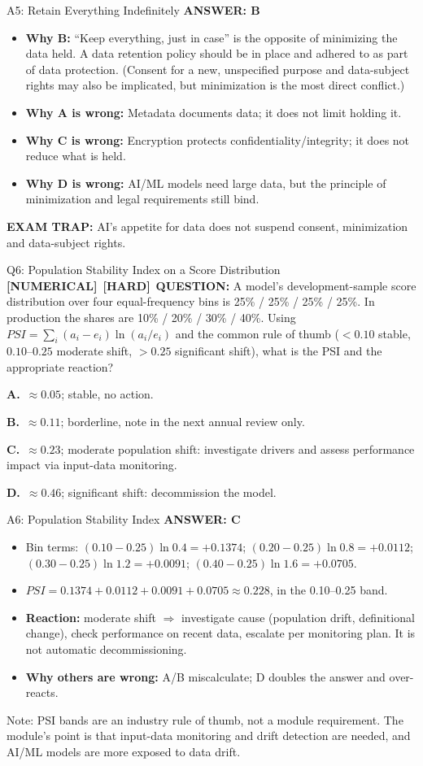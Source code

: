 \documentclass[8pt]{beamer}
\newcommand{\fs}{\fontsize{10}{12}\selectfont}
\newcommand{\opts}[4]{\par\vspace{0.12cm}\noindent\textbf{A.}~#1\par\vspace{0.08cm}\noindent\textbf{B.}~#2\par\vspace{0.08cm}\noindent\textbf{C.}~#3\par\vspace{0.08cm}\noindent\textbf{D.}~#4\par}
\newcommand{\ans}[1]{\textcolor{myblue}{\textbf{ANSWER: #1}}}
\newcommand{\trap}[1]{\textcolor{myred}{\textbf{EXAM TRAP:}} #1}
\newcommand{\numtag}{\textcolor{mypurple}{\textbf{[NUMERICAL]}}}
\newcommand{\hard}{\textcolor{myorange}{\textbf{[HARD]}}}
\begin{document}
\begin{frame}[t]{A5: Retain Everything Indefinitely}
\fs
\ans{B}
\begin{itemize}
\item \textbf{Why B:} ``Keep everything, just in case'' is the opposite of minimizing the data held. A data retention policy should be in place and adhered to as part of data protection. (Consent for a new, unspecified purpose and data-subject rights may also be implicated, but minimization is the most direct conflict.)
\item \textbf{Why A is wrong:} Metadata documents data; it does not limit holding it.
\item \textbf{Why C is wrong:} Encryption protects confidentiality/integrity; it does not reduce what is held.
\item \textbf{Why D is wrong:} AI/ML models need large data, but the principle of minimization and legal requirements still bind.
\end{itemize}
\trap{AI's appetite for data does not suspend \textcolor{myblue}{consent, minimization and data-subject rights}.}
\end{frame}

\begin{frame}[t]{Q6: Population Stability Index on a Score Distribution}
\fs
\numtag\ \hard\ \textbf{QUESTION:} A model's development-sample score distribution over four equal-frequency bins is 25\% / 25\% / 25\% / 25\%. In production the shares are 10\% / 20\% / 30\% / 40\%. Using $PSI=\sum_i (a_i-e_i)\ln(a_i/e_i)$ and the common rule of thumb ($<0.10$ stable, $0.10$--$0.25$ moderate shift, $>0.25$ significant shift), what is the PSI and the appropriate reaction?
\opts{$\approx 0.05$; stable, no action.}
{$\approx 0.11$; borderline, note in the next annual review only.}
{$\approx 0.23$; moderate population shift: investigate drivers and assess performance impact via input-data monitoring.}
{$\approx 0.46$; significant shift: decommission the model.}
\end{frame}

\begin{frame}[t]{A6: Population Stability Index}
\fs
\ans{C}
\begin{itemize}
\item Bin terms: $(0.10-0.25)\ln 0.4=+0.1374$; $(0.20-0.25)\ln 0.8=+0.0112$; $(0.30-0.25)\ln 1.2=+0.0091$; $(0.40-0.25)\ln 1.6=+0.0705$.
\item $PSI = 0.1374+0.0112+0.0091+0.0705 \approx \mathbf{0.228}$, in the 0.10--0.25 band.
\item \textbf{Reaction:} moderate shift $\Rightarrow$ investigate cause (population drift, definitional change), check performance on recent data, escalate per monitoring plan. It is not automatic decommissioning.
\item \textbf{Why others are wrong:} A/B miscalculate; D doubles the answer and over-reacts.
\end{itemize}
\textcolor{mygray}{Note: PSI bands are an industry rule of thumb, not a module requirement. The module's point is that input-data monitoring and drift detection are needed, and AI/ML models are more exposed to data drift.}
\end{frame}
\end{document}
